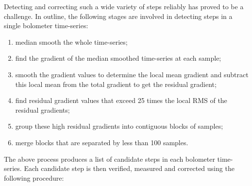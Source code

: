 \documentclass[useAMS,usenatbib,nofootinbib]{mn2e}
\begin{document}
Detecting and correcting such a wide variety of steps reliably has
proved to be a challenge. In outline, the following stages are
involved in detecting steps in a single bolometer time-series:

\begin{enumerate}

\item median smooth the whole time-series;

\item find the gradient of the median smoothed time-series at each
sample;

\item smooth the gradient values to determine the local mean gradient
and subtract this local mean from the total gradient to get the
residual gradient;

\item find residual gradient values that exceed 25 times the local RMS
of the residual gradients;

\item group these high residual gradients into contiguous blocks of
samples;

\item merge blocks that are separated by less than 100 samples.
\end{enumerate}

The above process produces a list of candidate steps in each bolometer
time-series. Each candidate step is then verified, measured and corrected
using the following procedure:
\end{document}
